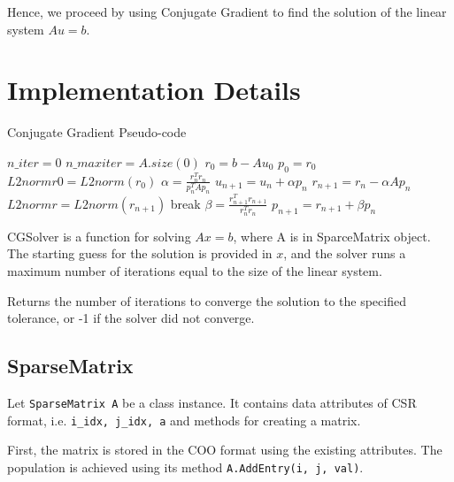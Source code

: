 \documentclass[12pt]{article}
\begin{document}
Hence, we proceed by using Conjugate Gradient to find the solution of the linear system $Au=b$.

\section{Implementation Details}

\begin{algorithm*}
\scriptsize
\caption{Conjugate Gradient Pseudo-code}\label{al:hybrid_algo}
\begin{algorithmic}[1]
\State $n\_iter = 0$ 
\State $n\_maxiter = A.size(0)$ 
\State $r_0 = b - Au_0$
\State $p_0 = r_0$
\State $L2normr0 = L2norm(r_0)$
    \State $\alpha = \frac{r^T_n r_n}{p_n^T A p_n}$
    \State $u_{n+1} = u_n + \alpha p_n$
    \State $r_{n+1} = r_n - \alpha A p_n$
    \State $L2normr = L2norm(r_{n+1})$
        \State break
    \EndIf
    \State $\beta = \frac{r^T_{n+1} r_{n+1}}{r_n^T r_n}$
    \State $p_{n+1} = r_{n+1} + \beta p_n$
\EndWhile

\EndFunction



\end{algorithmic}
\end{algorithm*}
 


CGSolver is a function for solving $Ax = b$, where A is in SparceMatrix object. The starting guess for the solution is provided in $x$, and the solver runs a maximum number of iterations equal to the size of the linear system.  

Returns the number of iterations to converge the solution to the specified
		tolerance, or -1 if the solver did not converge.

\subsection{SparseMatrix}

Let \texttt{SparseMatrix A} be a class instance. It contains data attributes of CSR format, i.e. \texttt{i\_idx, j\_idx, a} and methods for creating a matrix.

First, the matrix is stored in the COO format using the existing attributes. The population is achieved using its method \texttt{A.AddEntry(i, j, val)}.
\end{document}
